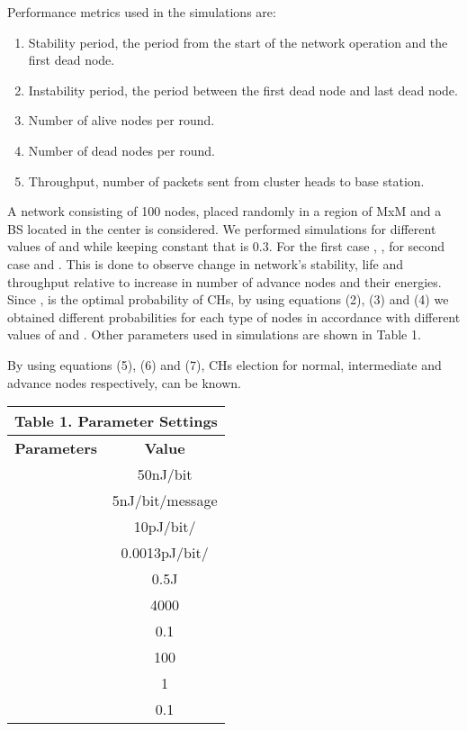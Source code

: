 \documentclass[conference]{IEEEtran}
\begin{document}
Performance metrics used in the simulations are:\\
\begin{enumerate}
  \item Stability period, the period from the start of the network operation and the first dead node.
  \item Instability period, the period between the first dead node and last dead node.
  \item Number of alive nodes per round.
  \item Number of dead nodes per round.
  \item Throughput, number of packets sent from cluster heads to base station.\\
\end{enumerate}
	
A network consisting of 100 nodes, placed randomly in a region of MxM and a BS located in the center is considered. We performed simulations for different values of  and  while keeping  constant that is 0.3. For the first case , , for second case  and . This is done to observe change in network's stability, life and throughput relative to increase in number of advance nodes and their energies. Since , is the optimal probability of CHs, by using equations (2), (3) and (4) we obtained different probabilities for each type of nodes in accordance with different values of  and . Other parameters used in simulations are shown in Table 1.

By using equations (5), (6) and (7), CHs election for normal, intermediate and advance nodes respectively, can be known.


\begin{table}[ht]
\centering
\begin{tabular}{|c |c |} \multicolumn{2}{c}{Table 1. Parameter Settings}\\
\hline
\textbf{ Parameters} & \textbf{Value}  \\
\hline
 & 50nJ/bit\\
\hline                   & 5nJ/bit/message  \\
\hline
& 10pJ/bit/  \\
\hline
 & 0.0013pJ/bit/    \\
\hline
  & 0.5J \\
 \hline
  & 4000 \\
 \hline
  & 0.1 \\
\hline
  & 100\\
 \hline
  & 1 \\
 \hline
  & 0.1 \\\hline
\end{tabular}
\end{table}
\end{document}
